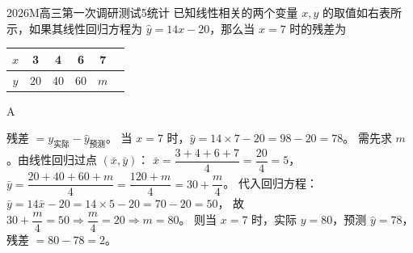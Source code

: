 
\begin{problem}{2026}{M}{高三第一次调研测试}{5}{统计}
已知线性相关的两个变量 $x,y$ 的取值如右表所示，如果其线性回归方程为 $\hat{y}=14x-20$，那么当 $x=7$ 时的残差为
\begin{center}
\begin{tabular}{c|ccccc}
$x$ & 3 & 4 & 6 & 7 \\
\hline
$y$ & 20 & 40 & 60 & $m$
\end{tabular}
\end{center}
\begin{choices}
\end{choices}
\end{problem}

\begin{answer}
A
\end{answer}

\begin{solutions}
残差 $= y_{\text{实际}} - \hat{y}_{\text{预测}}$。  
当 $x=7$ 时，$\hat{y}=14\times7-20=98-20=78$。  
需先求 $m$。由线性回归过点 $(\bar{x},\bar{y})$：  
$\bar{x}=\dfrac{3+4+6+7}{4}=\dfrac{20}{4}=5$，  
$\bar{y}=\dfrac{20+40+60+m}{4}=\dfrac{120+m}{4}=30+\dfrac{m}{4}$。  
代入回归方程：$\bar{y}=14\bar{x}-20=14\times5-20=70-20=50$，  
故 $30+\dfrac{m}{4}=50\Rightarrow \dfrac{m}{4}=20\Rightarrow m=80$。  
则当 $x=7$ 时，实际 $y=80$，预测 $\hat{y}=78$，残差 $=80-78=2$。
\end{solutions}